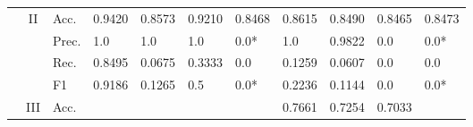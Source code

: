 \begin{tabular}{cclllllllll}
    \cmidrule{2-11}
                                                                                                               & \multirow{4}{*}{II}               & Acc.                                                 & 0.9420                  & 0.8573                  & 0.9210                       & 0.8468                  & 0.8615                                                                       & 0.8490                                                                      & 0.8465                                    & 0.8473                                    \\
                                                                                                               &                                   & Prec.                                                & 1.0                     & 1.0                     & 1.0                          & 0.0*                    & 1.0                                                                          & 0.9822                                                                      & 0.0                                       & 0.0*                                      \\
                                                                                                               &                                   & Rec.                                                 & 0.8495                  & 0.0675                  & 0.3333                       & 0.0                     & 0.1259                                                                       & 0.0607                                                                      & 0.0                                       & 0.0                                       \\
                                                                                                               &                                   & F1                                                   & 0.9186                  & 0.1265                  & 0.5                          & 0.0*                    & 0.2236                                                                       & 0.1144                                                                      & 0.0                                       & 0.0*                                      \\ 
    \cmidrule{2-11}
                                                                                                               & \multirow{4}{*}{III}              & Acc.                                                 &                         &                         &                              &                         & 0.7661                                                                       & 0.7254                                                                      & 0.7033                                    &                                           \\

\end{tabular}
